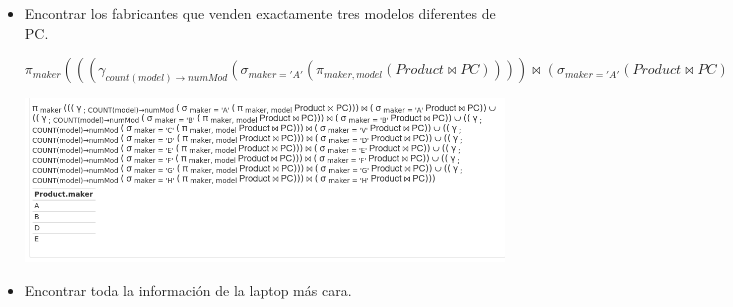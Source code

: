 \documentclass[12pt, letterpaper]{article}
\begin{document}
\begin{itemize}
\begin{itemize}
                \item[\textbf{l.}]  Encontrar los fabricantes que venden 
                                    exactamente tres modelos diferentes de PC. 
                                    
                                    \begin{center}
                                        $\pi_{maker}(((\gamma_{count(model)\rightarrow numMod}(\sigma_{maker='A'}(\pi_{maker,model}(Product \Join PC)))) \Join 
                                        (\sigma_{maker='A'}(Product \Join PC))) \cup ((\gamma_{count(model)\rightarrow numMod}(\sigma_{maker='B'}(\pi_{maker,model}(Product \Join PC)))) \Join 
                                        (\sigma_{maker='B'}(Product \Join PC))) \cup ((\gamma_{count(model)\rightarrow numMod}(\sigma_{maker='C'}(\pi_{maker,model}(Product \Join PC)))) \Join 
                                        (\sigma_{maker='C'}(Product \Join PC))) \cup ((\gamma_{count(model)\rightarrow numMod}(\sigma_{maker='D'}(\pi_{maker,model}(Product \Join PC)))) \Join 
                                        (\sigma_{maker='D'}(Product \Join PC))) \cup ((\gamma_{count(model)\rightarrow numMod}(\sigma_{maker='E'}(\pi_{maker,model}(Product \Join PC)))) \Join 
                                        (\sigma_{maker='E'}(Product \Join PC))) \cup ((\gamma_{count(model)\rightarrow numMod}(\sigma_{maker='G'}(\pi_{maker,model}(Product \Join PC)))) \Join 
                                        (\sigma_{maker='F'}(Product \Join PC))) \cup ((\gamma_{count(model)\rightarrow numMod}(\sigma_{maker='H'}(\pi_{maker,model}(Product \Join PC)))) \Join 
                                        (\sigma_{maker='H'}(Product \Join PC))))$ \vspace{.3cm}

                                        \includegraphics[scale=0.35]{l.png}
                                    \end{center}

                \newpage

                \item[\textbf{m.}]  Encontrar toda la información de la laptop 
                                    más cara. 


\end{itemize}
\end{itemize}
\end{document}
